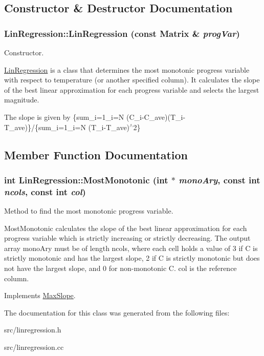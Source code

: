 \subsection{Constructor \& Destructor Documentation}
\hypertarget{classLinRegression_a0d747e38f7a8997765be15f43062290c}{
\subsubsection[{LinRegression}]{\setlength{\rightskip}{0pt plus 5cm}LinRegression::LinRegression (const {\bf Matrix} \& {\em progVar})}}
\label{de/d89/classLinRegression_a0d747e38f7a8997765be15f43062290c}


Constructor. 

\hyperlink{classLinRegression}{LinRegression} is a class that determines the most monotonic progress variable with respect to temperature (or another specified column). It calculates the slope of the best linear approximation for each progress variable and selects the largest magnitude.

The slope is given by \{sum\_\-i=1\_\-i=N (C\_\-i-\/C\_\-ave)(T\_\-i-\/T\_\-ave)\}/\{sum\_\-i=1\_\-i=N (T\_\-i-\/T\_\-ave)$^\wedge$2\} 

\subsection{Member Function Documentation}
\hypertarget{classLinRegression_a1f245c4e47637f3f1d94f6129861406d}{
\subsubsection[{MostMonotonic}]{\setlength{\rightskip}{0pt plus 5cm}int LinRegression::MostMonotonic (int $\ast$ {\em monoAry}, \/  const int {\em ncols}, \/  const int {\em col})}}
\label{de/d89/classLinRegression_a1f245c4e47637f3f1d94f6129861406d}


Method to find the most monotonic progress variable. 

MostMonotonic calculates the slope of the best linear approximation for each progress variable which is strictly increasing or strictly decreasing. The output array monoAry must be of length ncols, where each cell holds a value of 3 if C is strictly monotonic and has the largest slope, 2 if C is strictly monotonic but does not have the largest slope, and 0 for non-\/monotonic C. col is the reference column. 

Implements \hyperlink{classMaxSlope_a494b1b1ae073d3b29fe7cdc023ce7861}{MaxSlope}.



The documentation for this class was generated from the following files:\begin{DoxyCompactItemize}
\item 
src/linregression.h\item 
src/linregression.cc\end{DoxyCompactItemize}
